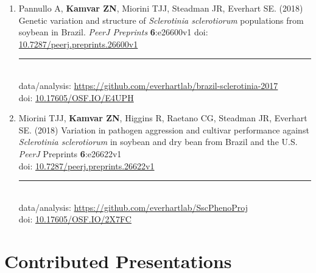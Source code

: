 \begin{enumerate}[leftmargin = 14pt]

	\item Pannullo A, \textbf{Kamvar ZN}, Miorini TJJ, Steadman JR, Everhart SE.
	(2018) Genetic variation and structure of \textit{Sclerotinia sclerotiorum}
	populations from soybean in Brazil. \textit{PeerJ Preprints}
	\textbf{6}:e26600v1 doi:
	\href{https://doi.org/10.7287/peerj.preprints.26600v1}{10.7287/peerj.preprints.26600v1}\\
	\rule[0.25\baselineskip]{0.25\textwidth}{0.5pt}\\
	data/analysis:
	\href{https://github.com/everhartlab/brazil-sclerotinia-2017#readme}{https://github.com/everhartlab/brazil-sclerotinia-2017}\\
	doi:\phantom{t/analysis:} \href{https://doi.org/10.17605/OSF.IO/E4UPH}{10.17605/OSF.IO/E4UPH}

	\item Miorini TJJ, \textbf{Kamvar ZN}, Higgins R, Raetano CG, Steadman JR, Everhart SE. (2018) Variation in pathogen aggression and cultivar performance against \textit{Sclerotinia sclerotiorum} in soybean and dry bean from Brazil and the U.S. \textit{PeerJ} Preprints \textbf{6}:e26622v1\\
	doi: \href{https://doi.org/10.7287/peerj.preprints.26622v1}{10.7287/peerj.preprints.26622v1}\\
	\rule[0.25\baselineskip]{0.25\textwidth}{0.5pt}\\
	data/analysis:
	\href{https://github.com/everhartlab/SscPhenoProj#readme}{https://github.com/everhartlab/SscPhenoProj}\\
	doi:\phantom{t/analysis:} \href{https://doi.org/10.17605/OSF.IO/2X7FC}{10.17605/OSF.IO/2X7FC}

\end{enumerate}


\section{Contributed Presentations}


